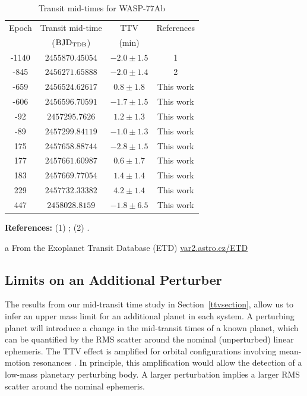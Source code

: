 \begin{table}[ht]
\centering
\begin{threeparttable}
\caption{Transit mid-times for WASP-77Ab}
\label{times_wasp77}
\begin{tabular}{cccc}
\hline \hline
Epoch & Transit mid-time & TTV & References\\
      & (${\rm BJD_{TDB}}$) & (min) &  \\
\hline
-1140 & $2455870.45054$ & $-2.0\pm1.5$ & 1 \\
-845 & $2456271.65888$ & $-2.0\pm1.4$ & 2 \\
-659 & $2456524.62617$ & $0.8\pm1.8$ & This work\tnote{a} \\
-606 & $2456596.70591$ & $-1.7\pm1.5$  & This work\tnote{a}  \\
-92 & $2457295.7626$  & $1.2\pm1.3$& This work \\
-89 & $2457299.84119$ &  $-1.0\pm1.3$ & This work \\
175 & $2457658.88744$ & $-2.8\pm1.5$ & This work\\
177 & $2457661.60987$   & $0.6\pm1.7$ & This work\tnote{a} \\
183 & $2457669.77054$ &  $1.4\pm1.4$  & This work  \\
229 & $2457732.33382$ & $4.2\pm1.4$& This work\tnote{a} \\
447 & $2458028.8159$  & $-1.8\pm6.5$ & This work\\ 
\hline
\end{tabular}
\begin{tablenotes}
\item \textbf{References:} (1) \citet{Maxted2013}; (2) \cite{Turner2016}.
\item[a] From the Exoplanet Transit Database (ETD)  \url{var2.astro.cz/ETD}
\end{tablenotes}
\end{threeparttable}
\end{table}

\subsection{Limits on an Additional Perturber}\label{addper}

The results from our mid-transit time study in Section~\ref{ttvsection}, allow us to infer an upper mass limit for an additional planet in each system. A perturbing planet will introduce a change in the mid-transit times of a known planet, which can be quantified by the RMS scatter around the nominal (unperturbed) linear ephemeris. The TTV effect is amplified for orbital configurations involving mean-motion resonances \citep{Agol2005, Holman2005, 2008ApJ...688..636N}. In principle, this amplification would allow the detection of a low-mass planetary perturbing body. A larger perturbation implies a larger RMS scatter around the nominal ephemeris.

